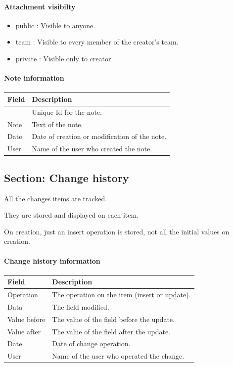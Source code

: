 \documentclass[letterpaper,10pt,english]{sphinxmanual}
\begin{document}
\paragraph{Attachment visibilty}
\begin{itemize}
\item {} 
public : Visible to anyone.

\item {} 
team : Visible to every member of the creator’s team.

\item {} 
private :  Visible only to creator.

\end{itemize}
\paragraph{Note information}

\begin{tabulary}{\linewidth}{|l|l|}
\hline
\textsf{\relax 
Field
} & \textsf{\relax 
Description
}\\
\hline
{\hyperref[Glossary:term-id]{\emph{}}}
 & 
Unique Id for the note.
\\
\hline
Note
 & 
Text of the note.
\\
\hline
Date
 & 
Date of creation or modification of the note.
\\
\hline
User
 & 
Name of the user who created the note.
\\
\hline\end{tabulary}



\subsection{Section: Change history}
\label{Gui:section-change-history}\label{Gui:gui-chg-history-section-label}\label{Gui:index-6}
All the changes items are tracked.

They are stored and displayed on each item.

On creation, just an insert operation is stored, not all the initial values on creation.
\paragraph{Change history information}

\begin{tabulary}{\linewidth}{|l|l|}
\hline
\textsf{\relax 
Field
} & \textsf{\relax 
Description
}\\
\hline
Operation
 & 
The operation on the item (insert or update).
\\
\hline
Data
 & 
The field modified.
\\
\hline
Value before
 & 
The value of the field before the update.
\\
\hline
Value after
 & 
The value of the field after the update.
\\
\hline
Date
 & 
Date of change operation.
\\
\hline
User
 & 
Name of the user who operated the change.
\\
\hline\end{tabulary}
\end{document}
